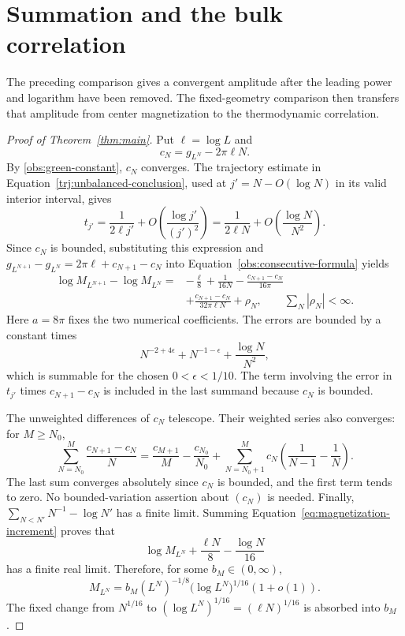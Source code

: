 \section{Summation and the bulk correlation}\label{sec:conclusion}

The preceding comparison gives a convergent amplitude after the
leading power and logarithm have been removed.  The fixed-geometry
comparison then transfers that amplitude from center magnetization
to the thermodynamic correlation.

\begin{proof}[Proof of Theorem~\ref{thm:main}]
Put \(\ell=\log L\) and
\[
                 c_N=g_{L^N}-2\pi\ell N.
\]
By \eqref{obs:green-constant}, \(c_N\) converges.  The
trajectory estimate in Equation~\eqref{trj:unbalanced-conclusion}, used at
\(j'=N-O(\log N)\) in its valid interior interval, gives
\[
 t_{j'}=\frac{1}{2\ell j'}
            +O\left(\frac{\log j'}{(j')^2}\right)
        =\frac{1}{2\ell N}
            +O\left(\frac{\log N}{N^2}\right).
\]
Since \(c_N\) is bounded, substituting this expression and
\(g_{L^{N+1}}-g_{L^N}=2\pi\ell+c_{N+1}-c_N\) into
Equation~\eqref{obs:consecutive-formula} yields
\begin{equation}\label{eq:magnetization-increment}
 \begin{split}
 \log M_{L^{N+1}}-\log M_{L^N}
  ={}&-\frac{\ell}{8}+\frac{1}{16N}
       -\frac{c_{N+1}-c_N}{16\pi}\\
     &+\frac{c_{N+1}-c_N}{32\pi\ell N}+\rho_N,
                \qquad \sum_N|\rho_N|<\infty .
 \end{split}
\end{equation}
Here \(a=8\pi\) fixes the two numerical coefficients.  The errors
are bounded by a constant times
\[
 N^{-2+4\epsilon}+N^{-1-\epsilon}
                       +\frac{\log N}{N^2},
\]
which is summable for the chosen \(0<\epsilon<1/10\).  The term
involving the error in \(t_{j'}\) times \(c_{N+1}-c_N\) is included
in the last summand because \(c_N\) is bounded.

The unweighted differences of \(c_N\) telescope.  Their weighted
series also converges: for \(M\ge N_0\),
\[
 \sum_{N=N_0}^M\frac{c_{N+1}-c_N}{N}
 =\frac{c_{M+1}}M-\frac{c_{N_0}}{N_0}
   +\sum_{N=N_0+1}^M c_N
                \left(\frac1{N-1}-\frac1N\right).
\]
The last sum converges absolutely since \(c_N\) is bounded, and the
first term tends to zero.  No bounded-variation assertion about
\((c_N)\) is needed.  Finally,
\(\sum_{N<N'}N^{-1}-\log N'\) has a finite limit.  Summing
Equation~\eqref{eq:magnetization-increment} proves that
\[
       \log M_{L^N}+\frac{\ell N}{8}-\frac{\log N}{16}
\]
has a finite real limit.  Therefore, for some \(b_M\in(0,\infty)\),
\begin{equation}\label{eq:center-asymptotic}
          M_{L^N}
     =b_M(L^N)^{-1/8}\bigl(\log L^N\bigr)^{1/16}(1+o(1)).
\end{equation}
The fixed change from \(N^{1/16}\) to
\((\log L^N)^{1/16}=(\ell N)^{1/16}\) is absorbed into \(b_M\).


\end{proof}
